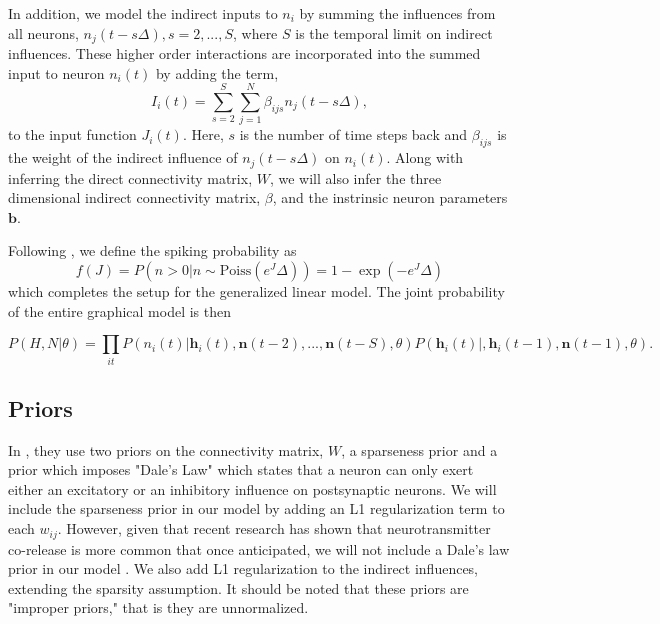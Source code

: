 \documentclass{article}
\begin{document}
In addition, we model the indirect inputs to $n_i$ by summing the
influences from all neurons, $n_j(t-s\Delta), s=2,...,S$, where $S$
is the temporal limit on indirect influences. These higher order
interactions are incorporated into the summed input to neuron
$n_i(t)$ by adding the term,
\begin{equation}
\label{new_term}
I_i(t)=\displaystyle\sum\limits_{s=2}^S\sum\limits_{j=1}^N \beta_{ijs}n_j(t-s\Delta),
\end{equation}
to the input function $J_i(t)$. Here, $s$ is the number of time
steps back and $\beta_{ijs}$ is the weight of the indirect influence
of $n_j(t-s\Delta)$ on $n_i(t)$. Along with inferring the direct connectivity matrix, $W$, we will
also infer the three dimensional indirect connectivity matrix, $\beta$, and the instrinsic neuron parameters $\mathbf{b}$.

Following \citep{mishchencko2011}, we define the spiking probability as 
\begin{equation} \label{f}
f(J) = P\left(n>0 | n \sim \text{Poiss}(e^J\Delta)\right) = 1 - \exp(-e^J\Delta)
\end{equation}
which completes the setup for the generalized linear model. The joint probability of the entire graphical model is then

\begin{equation} \label{f}
P(H,N|\theta) = \prod_{it}P(n_i(t)|\mathbf{h}_i(t),\mathbf{n}(t-2),...,\mathbf{n}(t-S),\theta)P(\mathbf{h}_i(t)|,\mathbf{h}_i(t-1),\mathbf{n}(t-1),\theta).
\end{equation}

\subsection{Priors}
In \citep{mishchencko2011}, they use two priors on the connectivity
matrix, $W$, a sparseness prior and a prior which imposes "Dale's
Law" which states that a neuron can only exert either an excitatory
or an inhibitory influence on postsynaptic neurons. We will include
the sparseness prior in our model by adding an L1 regularization
term to each $w_{ij}$. However, given that recent research has shown
that neurotransmitter co-release is more common that once anticipated,
we will not include a Dale's law prior in our model \citep{thomas2003}.
We also add L1 regularization to the indirect influences, extending
the sparsity assumption. It should be noted that these priors are "improper priors," that is they are unnormalized.
\end{document}
